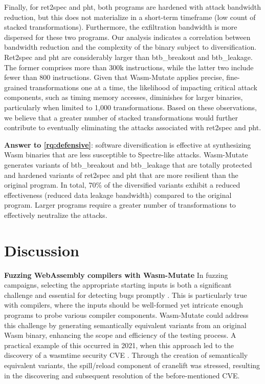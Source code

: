 \documentclass[sigplan,screen]{acmart}
\newcommand{\tool}{{\sc Wasm-Mutate}\xspace}
\newcommand{\wasm}{Wasm\xspace}
\newcommand{\Wasm}{WebAssembly\xspace}
\begin{document}
Finally, for ret2spec and pht, both programs are hardened with attack bandwidth reduction, but this does not materialize in a short-term timeframe (low count of stacked transformations).
Furthermore,  the exfiltration bandwidth is more dispersed for these two programs.
Our analysis indicates a correlation between bandwidth reduction and the complexity of the binary subject to diversification.
Ret2spec and pht are considerably larger than btb\_breakout and btb\_leakage.
The former comprises more than 300k instructions, while the latter two include fewer than 800 instructions.
Given that \tool applies precise, fine-grained transformations one at a time, the likelihood of impacting critical attack components, such as timing memory accesses, diminishes for larger binaries, particularly when limited to 1,000 transformations.
Based on these observations, we believe that a greater number of stacked transformations would further contribute to eventually eliminating the attacks associated with ret2spec and pht.


\begin{tcolorbox}[boxrule=1pt,arc=.3em,boxsep=-1.3mm]
  \textbf{Answer to \ref{rq:defensive}}:   software diversification is effective at synthesizing \wasm binaries that are less susceptible  to Spectre-like attacks.  
  \tool generates variants of btb\_breakout and btb\_leakage that are totally protected and hardened variants of ret2spec and pht that are more resilient than the original program.
  In total, 70\% of the diversified variants exhibit a reduced effectiveness (reduced data leakage bandwidth) compared to the original program.
  Larger programs require a greater number of transformations to effectively neutralize the attacks.
\end{tcolorbox}



\section{Discussion}
\label{discussion}


\textbf{Fuzzing \Wasm compilers with \tool}
In fuzzing campaigns, selecting the appropriate starting inputs is both a significant challenge and essential for detecting bugs promptly \cite{7958599}. 
This is particularly true with compilers, where the inputs should be well-formed yet intricate enough programs to probe various compiler components. 
\tool could address this challenge by generating semantically equivalent variants from an original \wasm binary, enhancing the scope and efficiency of the testing process. 
A practical example of this occurred in 2021, when this approach led to the discovery of a wasmtime security CVE \cite{CVE}. 
Through the creation of semantically equivalent variants, the spill/reload component of cranelift was stressed, resulting in the discovering and subsequent resolution of the before-mentioned CVE.
\end{document}
